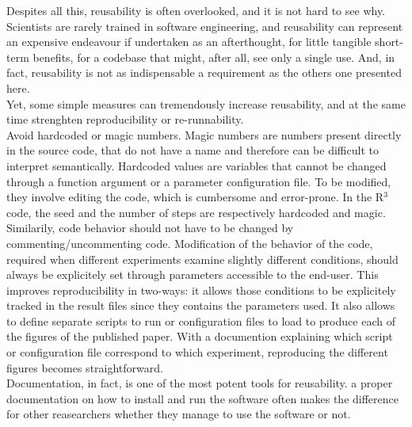 \documentclass[a4paper,11pt]{article}
\begin{document}
Despites all this, reusability is often overlooked, and it is not hard to see why. Scientists are rarely trained in software engineering, and reusability can represent an expensive endeavour if undertaken as an afterthought, for little tangible short-term benefits, for a codebase that might, after all, see only a single use. And, in fact, reusability is not as indispensable a requirement as the others one presented here.\\

Yet, some simple measures can tremendously increase reusability, and at the same time strenghten reproducibility or re-runnability.\\

Avoid hardcoded or magic numbers. Magic numbers are numbers present directly in the source code, that do not have a name and therefore can be difficult to interpret semantically. Hardcoded values are variables that cannot be changed through a function argument or a parameter configuration file. To be modified, they involve editing the code, which is cumbersome and error-prone. In the R$^3$ code, the seed and the number of steps are respectively hardcoded and magic.\\

Similarily, code behavior should not have to be changed by commenting/uncommenting code. Modification of the behavior of the code, required when different experiments examine slightly different conditions, should always be explicitely set through parameters accessible to the end-user. This improves reproducibility in two-ways: it allows those conditions to be explicitely tracked in the result files since they contains the parameters used. It also allows to define separate scripts to run or configuration files to load to produce each of the figures of the published paper. With a documention explaining which script or configuration file correspond to which experiment, reproducing the different figures becomes straightforward.\\


Documentation, in fact, is one of the most potent tools for reusability. a proper documentation on how to install and run the software often makes the difference for other reasearchers whether they manage to use the software or not.\\
\end{document}
